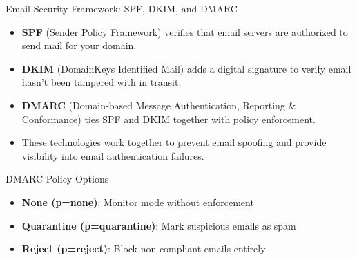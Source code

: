 \documentclass{beamer}
\begin{document}
                    \begin{frame}{Email Security Framework: SPF, DKIM, and DMARC}
                    \begin{itemize}
                        \item \textbf{SPF} (Sender Policy Framework) verifies that email servers are authorized to send mail for your domain.
                        \item \textbf{DKIM} (DomainKeys Identified Mail) adds a digital signature to verify email hasn't been tampered with in transit.
                        \item \textbf{DMARC} (Domain-based Message Authentication, Reporting \& Conformance) ties SPF and DKIM together with policy enforcement.
                        \item These technologies work together to prevent email spoofing and provide visibility into email authentication failures.
                    \end{itemize}
                    
                    \begin{block}{DMARC Policy Options}
                    \begin{itemize}
                        \item \textbf{None (p=none)}: Monitor mode without enforcement
                        \item \textbf{Quarantine (p=quarantine)}: Mark suspicious emails as spam
                        \item \textbf{Reject (p=reject)}: Block non-compliant emails entirely
                    \end{itemize}
                    \end{block}
                    \end{frame}
                    
\end{document}
